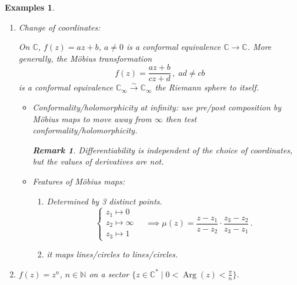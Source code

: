 \documentclass{article}
\theoremstyle{plain}\theoremheaderfont{\normalfont\itshape}\theorembodyfont{\rmfamily}\theoremseparator{.}\newtheorem*{rem}{Remark}\newtheorem*{ex}{Example}\newtheorem*{proof}{Proof}\newtheorem*{altp}{Alternative proof}\newtheorem*{con}{Consequences}\newtheorem*{notn}{Notations}\newtheorem*{cau}{Caution}\newtheorem*{term}{Terminology}\newtheorem*{keyex}{Key example}
\theoremstyle{plain}\theoremheaderfont{\normalfont\bfseries}\theorembodyfont{\rmfamily}\theoremseparator{.}\newtheorem{thm}{Theorem}[section]\newtheorem{lem}[thm]{Lemma}\newtheorem{prop}[thm]{Proposition}\newtheorem*{cor}{Corollary}\newtheorem{defn}[thm]{Definition}\newtheorem{clm}[thm]{Claim}\newtheorem{clminproof}{Claim}\newtheorem{leminproof}{Lemma}\newtheorem{app}{Application}
\theoremstyle{break}\theoremheaderfont{\normalfont\itshape}\theorembodyfont{\rmfamily}\theoremseparator{.\medskip}\newtheorem*{proofskip}{Proof}\newtheorem*{exs}{Examples}\newtheorem*{rems}{Remarks}\newtheorem*{rec}{Recall}\newtheorem*{ppts}{Properties}
\theoremstyle{break}\theoremheaderfont{\normalfont\bfseries}\theorembodyfont{\rmfamily}\theoremseparator{.\medskip}\newtheorem{lemskip}[thm]{Lemma}\newtheorem{defnskip}[thm]{Definition}\newtheorem{propskip}[thm]{Proposition}\newtheorem{thmskip}[thm]{Theorem}
\numberwithin{equation}{section}
\DeclareMathOperator*{\Arg}{Arg}
\newcommand{\NN}{\mathbb{N}}
\newcommand{\CC}{\mathbb{C}}
\begin{document}
    \begin{exs}
        \begin{enumerate}[topsep=0pt,label=(\roman*),parsep=1em]
            \item Change of coordinates:
            
            On \(\mathbb{C}\), \(f(z)=az+b\), \(a\ne 0\) is a conformal equivalence \(\mathbb{C}\to\mathbb{C}\). More generally, the M\"{o}bius transformation
            \[f(z)=\frac{az+b}{cz+d}\,,\; ad\ne cb\]
            is a conformal equivalence \(\CC_\infty\xrightarrow{\sim}\CC_\infty\) the Riemann sphere to itself.
            \begin{itemize}
                \item Conformality/holomorphicity at infinity: use pre/post composition by M\"{o}bius maps to move away from \(\infty\) then test conformality/holomorphicity.
                \begin{rem}
                    Differentiability is independent of the choice of coordinates, but the values of derivatives are not.
                \end{rem}
                \item Features of M\"{o}bius maps:
                \begin{enumerate}
                    \item Determined by 3 distinct points.
                    \[\begin{cases}
                        z_1\mapsto 0\\
                        z_2\mapsto \infty\\
                        z_3\mapsto 1
                    \end{cases}\quad\implies\mu(z)=\frac{z-z_1}{z-z_2}\cdot\frac{z_3-z_2}{z_3-z_1}\,.\]
                    \item it maps lines/circles to lines/circles.
                \end{enumerate}
            \end{itemize}
            \item \(f(z)=z^n\), \(n\in\NN\) on a sector \(\{z\in\mathbb{C}^*\mid 0<\Arg(z)<\frac{\pi}{n}\}\).
            \begin{figure}[ht!]
                \centering
\end{figure}
\end{enumerate}
\end{exs}
\end{document}
